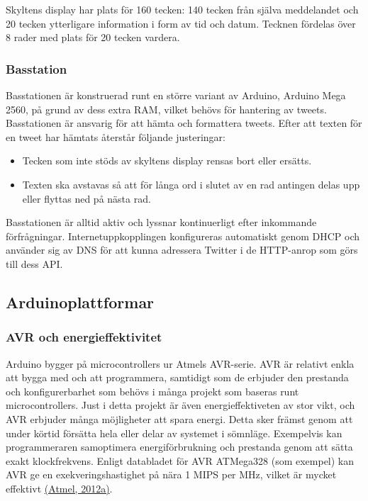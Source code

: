 \documentclass[a4paper,11pt]{article}
\begin{document}
Skyltens display har plats för 160 tecken: 140 tecken från själva meddelandet och 20 tecken ytterligare information i form av tid och datum. Tecknen fördelas över 8 rader med plats för 20 tecken vardera.

\subsubsection{Basstation}
Basstationen är konstruerad runt en större variant av Arduino, Arduino Mega 2560, på grund av dess extra RAM, vilket behövs för hantering av tweets. Basstationen är ansvarig för att hämta och formattera tweets. Efter att texten för en tweet har hämtats återstår följande justeringar:
	
	\begin{itemize}
    	\item Tecken som inte stöds av skyltens display rensas bort eller ersätts.
    	\item Texten ska avstavas så att för långa ord i slutet av en rad antingen delas upp eller flyttas ned på nästa rad.	
	\end{itemize}
	
Basstationen är alltid aktiv och lyssnar kontinuerligt efter inkommande förfrågningar. Internetuppkopplingen konfigureras automatiskt genom DHCP och använder sig av DNS för att kunna adressera Twitter i de HTTP-anrop som görs till dess API.

\subsection{Arduinoplattformar}

\subsubsection{AVR och energieffektivitet}
Arduino bygger på microcontrollers ur Atmels AVR-serie. AVR är relativt enkla att bygga med och att programmera, samtidigt som de erbjuder den prestanda och konfigurerbarhet som behövs i många projekt som baseras runt microcontrollers. Just i detta projekt är även energieffektiveten av stor vikt, och AVR erbjuder många möjligheter att spara energi. Detta sker främst genom att under körtid försätta hela eller delar av systemet i sömnläge. Exempelvis kan programmeraren samoptimera energiförbrukning och prestanda genom att sätta exakt klockfrekvens. Enligt databladet för AVR ATMega328 (som exempel) kan AVR ge en exekveringshastighet på nära 1 MIPS per MHz, vilket är mycket effektivt \hyperref[atmel]{(Atmel, 2012a)}. \\
\end{document}
